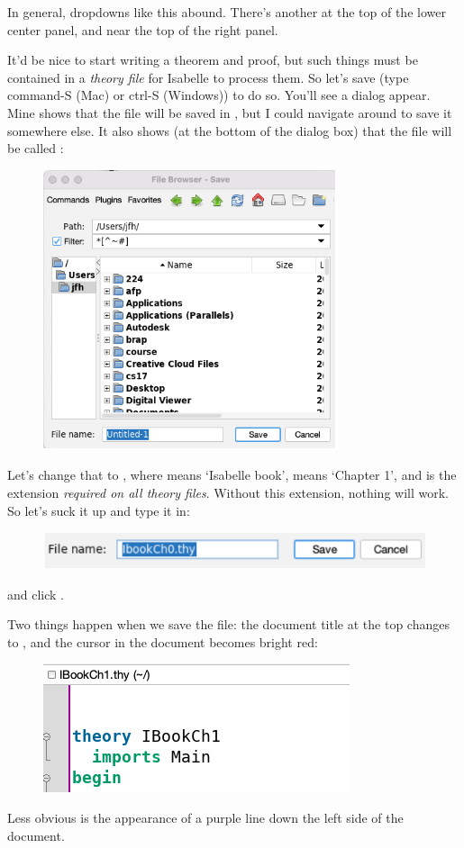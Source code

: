 In general, dropdowns like this abound. There's another at the top of the lower center panel, and near the top of the right panel. 

It'd be nice to start writing a theorem and proof, but such things must be contained in a \textit{theory file} for Isabelle to process them. So let's save  (type command-S (Mac) or ctrl-S (Windows)) to do so. You'll see a dialog appear. Mine shows that the file will be saved in , but I could navigate around to save it somewhere else. It also shows (at the bottom of the dialog box) that the file will be called :
\begin{figure}[h]
    \centering
    \includegraphics[width=0.5\linewidth]{TEXT/C01//Images/file-chooser.png}
\end{figure}
Let's change that to , where  means `Isabelle book',  means `Chapter 1', and  is the extension \textit{required on all theory files}. Without this extension, nothing will work. So let's suck it up and type it in:
\begin{figure}[h]
    \centering
    \includegraphics[width=0.75\linewidth]{TEXT/C01//Images/file-name-edit.png}
\end{figure}
and click . 

Two things happen when we save the file: the document title at the top changes to , and the cursor in the document becomes bright red:


\begin{figure}[h]
    \centering
    \includegraphics[width=0.5\linewidth]{TEXT/C01//Images/interface-update.png}
\end{figure}
Less obvious is the appearance of a purple line down the left side of the document. 

